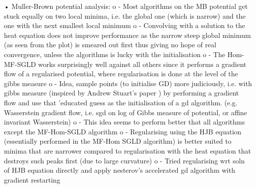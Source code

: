 \documentclass{article}
\begin{document}
•	Muller-Brown potential analysis:
o	- Most algorithms on the MB potential get stuck equally on two local minima, i.e. the global one (which is narrow) and the one with the next smallest local minimum
o	- Convolving with a solution to the heat equation does not improve performance as the narrow steep global minimum (as seen from the plot) is smeared out first thus giving no hope of real convergence, unless the algorithms is lucky with the initialisation
o	- The Hom-MF-SGLD works surprisingly well against all others since it performs a gradient flow of a regularised potential, where regularisation is done at the level of the gibbs measure
o	- Idea, sample points (to initialise GD) more judiciously, i.e. with gibbs measure (inspired by Andrew Stuart's paper ) by performing a gradient flow and use that 'educated guess as the initialisation of a gd algorithm. (e.g. Wasserstein gradient flow, i.e. sgd on log of Gibbs measure of potential, or affine invariant Wasserstein)
o	- This idea seems to perform better that all algorithms except the MF-Hom-SGLD algorithm
o	- Regularising using the HJB equation (essentially performed in the MF-Hom SGLD algorithm) is better suited to minima that are narrower compared to regularisation with the heat equation that destroys such peaks first (due to large curvature)
o	- Tried regularising wrt soln of HJB equation directly and apply nesterov's accelerated gd algorithm with gradient restarting
\end{document}
